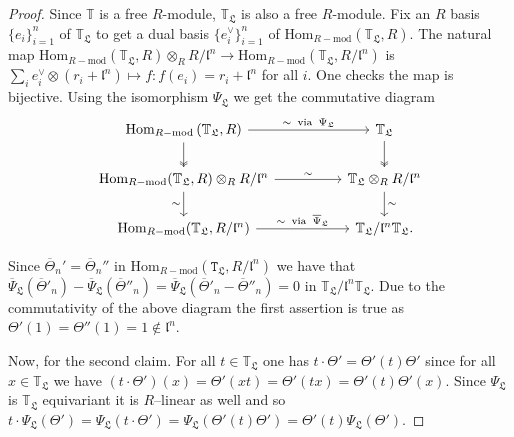 \documentclass[11pt]{amsart}
\begin{document}
	\begin{proof}
		Since $\mathbb{T}$ is a free $R$-module, $\mathbb{T}_\mathfrak{L}$ is also a free $R$-module. Fix an $R$ basis $\{e_i\}_{i=1}^n$ of $\mathbb{T}_{\mathfrak{L}}$ to get a dual basis $\{e_i^\vee\}_{i=1}^n$ of $\text{Hom}_{R-\text{mod}}(\mathbb{T}_\mathfrak{L}, R).$
		The natural map $ \text{Hom}_{R-\text{mod}}(\mathbb{T}_\mathfrak{L}, R) \otimes_R R/\mathfrak{l}^n \longrightarrow \text{Hom}_{R-\text{mod}}(\mathbb{T}_\mathfrak{L}, R/\mathfrak{l}^n) $
		is $\sum_{i} e_i^\vee \otimes (r_i +\mathfrak{l}^n) \mapsto f : f(e_i) = r_i + \mathfrak{l}^n$ for all $i$.
		One checks the map is bijective.
		Using the isomorphism $\Psi_\mathfrak{L}$ we get the commutative diagram
		\[\begin{tikzcd}
			{\text{Hom}_{R-\text{mod}}\left(\mathbb{T}_\mathfrak{L}, R \right)} && {\mathbb{T}_\mathfrak{L}} \\
			{\text{Hom}_{R-\text{mod}}(\mathbb{T}_\mathfrak{L}, R) \otimes_R R/\mathfrak{l}^n} && {\mathbb{T}_\mathfrak{L} \otimes_R R/\mathfrak{l}^n} \\
			{\text{Hom}_{R-\text{mod}}(\mathbb{T}_\mathfrak{L}, R/ \mathfrak{l}^n)} && {\mathbb{T}_\mathfrak{L}/\mathfrak{l}^n\mathbb{T}_\mathfrak{L}.}
			\arrow["{\sim \;\;\text{via} \;\;\Psi_\mathfrak{L}}", from=1-1, to=1-3]
			\arrow[two heads, from=1-1, to=2-1]
			\arrow[two heads, from=1-3, to=2-3]
			\arrow["\sim", from=2-1, to=2-3]
			\arrow["\sim"', from=2-1, to=3-1]
			\arrow["\sim", from=2-3, to=3-3]
			\arrow["{\sim \;\;\text{via} \;\;\overline{\Psi}_\mathfrak{L}}", from=3-1, to=3-3]
		\end{tikzcd}\]
		
		Since $\overline{\Theta}_n' = \overline{\Theta}_n''$ in $\text{Hom}_{R-\text{mod}}(\mathtt{T}_\mathfrak{L}, R/\mathfrak{l}^n)$ we have that $ \overline{\Psi}_\mathfrak{L}(\overline{\Theta}'_n) - \overline{\Psi}_\mathfrak{L}(\overline{\Theta}''_n) = \overline{\Psi}_\mathfrak{L}(\overline{\Theta}'_n - \overline{\Theta}''_n) = 0$ in $\mathbb{T}_\mathfrak{L}/ \mathfrak{l}^n\mathbb{T}_\mathfrak{L}.$ Due to the commutativity of the above diagram the first assertion is true as ${\Theta}'(1)= {\Theta}''(1) = 1 \not\in \mathfrak{l}^n .$
		
		Now, for  the second claim. For all $t \in \mathbb{T}_\mathfrak{L}$ one has  $t\cdot \Theta' = \Theta'(t) \Theta'$ since for all $x \in \mathbb{T}_\mathfrak{L}$ we have $(t\cdot \Theta')(x) = \Theta'(x t)
		= \Theta'(t x) 
		= \Theta'(t) \Theta'(x).$ Since $\Psi_\mathfrak{L}$ is $\mathbb{T}_\mathfrak{L}$ equivariant it is $R$--linear as well and so $	t \cdot \Psi_\mathfrak{L}( \Theta') = \Psi_{\mathfrak{L}}(t\cdot \Theta')
			= \Psi_{\mathfrak{L}}(\Theta'(t) \Theta')
			= \Theta'(t) \Psi_{\mathfrak{L}}(\Theta').$
	\end{proof}
\end{document}
